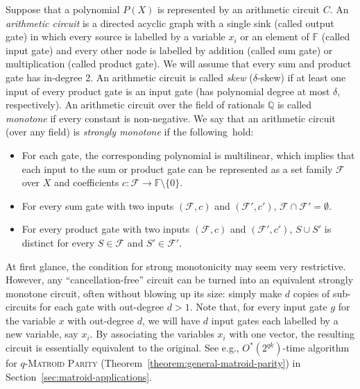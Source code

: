 \documentclass{theoretics}
\newcommand{\F}{\ensuremath{\mathbb F}\xspace}
\newcommand{\Q}{\ensuremath{\mathbb Q}\xspace}
\newcommand{\cF}{\ensuremath{\mathcal F}\xspace}
\begin{document}
Suppose that a polynomial $P(X)$ is represented by an arithmetic circuit $C$.
An \emph{arithmetic circuit} is a directed acyclic graph with a single sink (called output gate) in which every source is labelled by a variable $x_i$ or an element of $\F$ (called input gate) and every other node is labelled by addition (called sum gate) or multiplication (called product gate).
We will assume that every sum and product gate has in-degree 2.
An arithmetic circuit is called \emph{skew} ($\delta$-skew) if at least one input of every product gate is an input gate (has polynomial degree at most $\delta$, respectively).
An arithmetic circuit over the field of rationals $\Q$ is called \emph{monotone} if every constant is non-negative.
We say that an arithmetic circuit (over any field) is \emph{strongly monotone} if the following~hold:
\begin{itemize}
  \item For each gate, the corresponding polynomial is multilinear, which implies that each input to the sum or product gate can be represented as a set family $\cF$ over $X$ and coefficients $c \colon \cF \to \F \setminus \{ 0 \}$.
  \item For every sum gate with two inputs $(\cF, c)$ and $(\cF', c')$, $\cF \cap \cF' = \emptyset$.
  \item For every product gate with two inputs $(\cF, c)$ and $(\cF', c')$, $S \cup S'$ is distinct for every $S \in \cF$ and $S' \in \cF'$.
\end{itemize}
At first glance, the condition for strong monotonicity may seem very restrictive.
However, any ``cancellation-free'' circuit can be turned into an equivalent strongly monotone circuit, often without blowing up its size: simply make $d$ copies of sub-circuits for each gate with out-degree $d > 1$.
Note that, for every input gate $g$ for the variable $x$ with out-degree $d$, we will have $d$ input gates each labelled by a new variable, say $x_i$.
By associating the variables $x_i$ with one vector, the resulting circuit is essentially equivalent to the original.
See e.g., $O^*(2^{qk})$-time algorithm for \textsc{$q$-Matroid Parity} (Theorem~\ref{theorem:general-matroid-parity}) in Section~\ref{sec:matroid-applications}.
\end{document}
